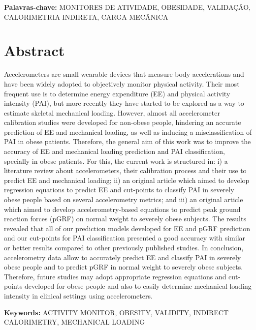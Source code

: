 \documentclass[12pt]{article}
\def\blankpage{%
      \clearpage%
      \thispagestyle{empty}%
      \addtocounter{page}{+0}%
      \null%
      \clearpage}
\begin{document}
\vspace{\fill}
\noindent
\textbf{Palavras-chave:} MONITORES DE ATIVIDADE, OBESIDADE, VALIDAÇÃO, CALORIMETRIA INDIRETA, CARGA MECÂNICA

\blankpage

\section*{\hfil Abstract \hfil}
\vspace{0.5em}

\noindent Accelerometers are small wearable devices that measure body accelerations and have been widely adopted to objectively monitor physical activity. Their most frequent use is to determine energy expenditure (EE) and physical activity intensity (PAI), but more recently they have started to be explored as a way to estimate skeletal mechanical loading. However, almost all accelerometer calibration studies were developed for non-obese people, hindering an accurate prediction of EE and mechanical loading, as well as inducing a misclassification of PAI in obese patients. Therefore, the general aim of this work was to improve the accuracy of EE and mechanical loading prediction and PAI classification, specially in obese patients. For this, the current work is structured in: i) a literature review about accelerometers, their calibration process and their use to predict EE and mechanical loading; ii) an original article which aimed to develop regression equations to predict EE and cut-points to classify PAI in severely obese people based on several accelerometry metrics; and iii) an original article which aimed to develop accelerometry-based equations to predict peak ground reaction forces (pGRF) on normal weight to severely obese subjects. The results revealed that all of our prediction models developed for EE and pGRF prediction and our cut-points for PAI classification presented a good accuracy with similar or better results compared to other previously published studies. In conclusion, accelerometry data allow to accurately predict EE and classify PAI in severely obese people and to predict pGRF in normal weight to severely obese subjects. Therefore, future studies may adopt appropriate regression equations and cut-points developed for obese people and also to easily determine mechanical loading intensity in clinical settings using accelerometers.

\vspace{\fill}
\noindent
\textbf{Keywords:} ACTIVITY MONITOR, OBESITY, VALIDITY, INDIRECT CALORIMETRY, MECHANICAL LOADING
\blankpage
\end{document}
